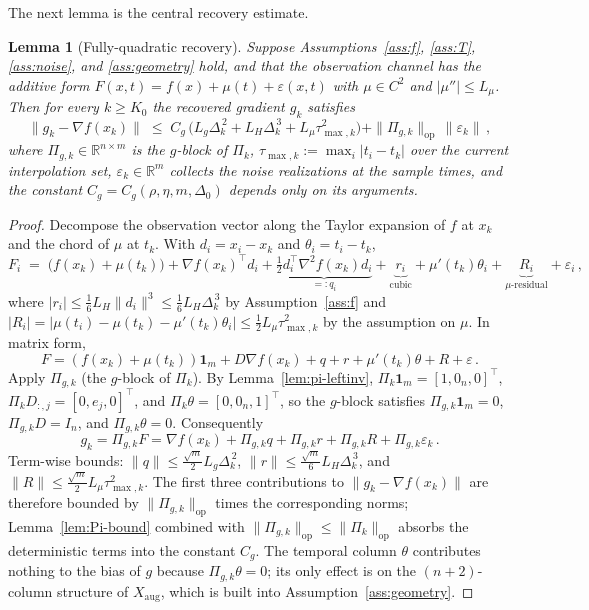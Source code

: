 \documentclass[11pt,a4paper]{article}
\newtheorem{lemma}[theorem]{Lemma}
\begin{document}
The next lemma is the central recovery estimate.

\begin{lemma}[Fully-quadratic recovery]
\label{lem:fully-quadratic}
Suppose Assumptions~\ref{ass:f}, \ref{ass:T},
\ref{ass:noise}, and \ref{ass:geometry} hold, and that the
observation channel has the additive form
$F(x,t)=f(x)+\mu(t)+\varepsilon(x,t)$ with $\mu\in C^2$ and
$|\mu''|\le L_\mu$. Then for every $k\ge K_0$ the recovered
gradient $g_k$ satisfies
\begin{equation}\label{eq:fully-quad}
  \|g_k-\nabla f(x_k)\|
  \;\le\;
  C_g\,\bigl(L_g\Delta_k^{\,2}+L_H\Delta_k^{\,3}+L_\mu\tau_{\max,k}^{2}\bigr)
  +\|\Pi_{g,k}\|_{\mathrm{op}}\,\|\varepsilon_k\|\,,
\end{equation}
where $\Pi_{g,k}\in\mathbb{R}^{n\times m}$ is the $g$-block of
$\Pi_k$, $\tau_{\max,k}:=\max_i|t_i-t_k|$ over the current
interpolation set, $\varepsilon_k\in\mathbb{R}^m$ collects the
noise realizations at the sample times, and the constant
$C_g=C_g(\rho,\eta,m,\Delta_0)$ depends only on its arguments.
\end{lemma}

\begin{proof}
Decompose the observation vector along the Taylor expansion of
$f$ at $x_k$ and the chord of $\mu$ at $t_k$. With $d_i=x_i-x_k$
and $\theta_i=t_i-t_k$,
\[
  F_i
  \;=\;\bigl(f(x_k)+\mu(t_k)\bigr)
   +\nabla f(x_k)^{\!\top}d_i
   +\underbrace{\tfrac{1}{2}d_i^{\!\top}\nabla^2 f(x_k)d_i}_{=:q_i}
   +\underbrace{r_i}_{\text{cubic}}
   +\mu'(t_k)\theta_i
   +\underbrace{R_i}_{\text{$\mu$-residual}}
   +\varepsilon_i\,,
\]
where $|r_i|\le\tfrac{1}{6}L_H\|d_i\|^3\le\tfrac{1}{6}L_H\Delta_k^{\,3}$
by Assumption~\ref{ass:f} and
$|R_i|=|\mu(t_i)-\mu(t_k)-\mu'(t_k)\theta_i|
       \le\tfrac{1}{2}L_\mu\tau_{\max,k}^{2}$ by the assumption
on $\mu$. In matrix form,
\[
  F = (f(x_k)+\mu(t_k))\mathbf{1}_m
      + D\nabla f(x_k) + q + r
      + \mu'(t_k)\theta + R + \varepsilon\,.
\]
Apply $\Pi_{g,k}$ (the $g$-block of $\Pi_k$). By
Lemma~\ref{lem:pi-leftinv},
$\Pi_k\mathbf{1}_m=[1,0_n,0]^{\!\top}$,
$\Pi_kD_{:,j}=[0,e_j,0]^{\!\top}$, and
$\Pi_k\theta=[0,0_n,1]^{\!\top}$, so the $g$-block satisfies
$\Pi_{g,k}\mathbf{1}_m=0$, $\Pi_{g,k}D=I_n$, and
$\Pi_{g,k}\theta=0$. Consequently
\[
  g_k = \Pi_{g,k}F = \nabla f(x_k) + \Pi_{g,k}q + \Pi_{g,k}r
        + \Pi_{g,k}R + \Pi_{g,k}\varepsilon_k\,.
\]
Term-wise bounds:
$\|q\|\le\tfrac{\sqrt{m}}{2}L_g\Delta_k^{\,2}$,
$\|r\|\le\tfrac{\sqrt{m}}{6}L_H\Delta_k^{\,3}$, and
$\|R\|\le\tfrac{\sqrt{m}}{2}L_\mu\tau_{\max,k}^{2}$. The first
three contributions to $\|g_k-\nabla f(x_k)\|$ are therefore
bounded by $\|\Pi_{g,k}\|_{\mathrm{op}}$ times the corresponding
norms; Lemma~\ref{lem:Pi-bound} combined with
$\|\Pi_{g,k}\|_{\mathrm{op}}\le\|\Pi_k\|_{\mathrm{op}}$ absorbs
the deterministic terms into the constant $C_g$. The temporal
column $\theta$ contributes nothing to the bias of $g$ because
$\Pi_{g,k}\theta=0$; its only effect is on the $(n+2)$-column
structure of $X_{\mathrm{aug}}$, which is built into
Assumption~\ref{ass:geometry}.
\end{proof}
\end{document}
